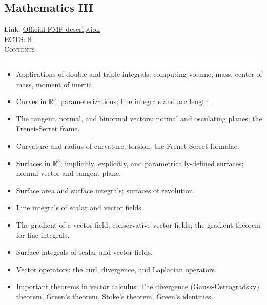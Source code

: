\documentclass[11pt, a4paper]{article}
\newenvironment{course}[3]{
\subsection{#1}%
Link: \href{#2}{Official FMF description}\\%
ECTS: #3%
\vspace{1ex}
\\
{\large \textsc{Contents}}\\[-0.9ex]%
\rule{\textwidth}{0.5pt}
\vspace{-3ex}
}
{}
\newenvironment{chapter}[1]{
\begin{tcolorbox}[title=#1, breakable]
}
{\end{tcolorbox}}
\begin{document}
\begin{course}{Mathematics III}{https://www.fmf.uni-lj.si/en/study-physics/programmes/1fiz/2020/7000777/courses/522/}{8}
\begin{chapter}{Multi-dimensional Riemann integration}
\begin{itemize}
            \item Applications of double and triple integrals: computing volume, mass, center of mass, moment of inertia.
        
        \end{itemize}
    \end{chapter}

    \begin{chapter}{Curves and surfaces in Euclidean space}
        \begin{itemize}
        
            \item Curves in $ \mathbb{R}^{3} $; parameterizations; line integrals and arc length.

            \item The tangent, normal, and binormal vectors; normal and osculating planes; the Frenet-Serret frame.

            \item Curvature and radius of curvature; torsion; the Frenet-Serret formulae.

            \item Surfaces in $ \mathbb{R}^{3} $; implicitly, explicitly, and parametrically-defined surfaces; normal vector and tangent plane.

            \item Surface area and surface integrals; surfaces of revolution.
        
        \end{itemize}

    \end{chapter}

    \begin{chapter}{Vector calculus}
        \begin{itemize}
        
            \item Line integrals of scalar and vector fields.

            \item The gradient of a vector field; conservative vector fields; the gradient theorem for line integrals.

            \item Surface integrals of scalar and vector fields.

            \item Vector operators: the curl, divergence, and Laplacian operators.

            \item Important theorems in vector calculus: The divergence (Gauss-Ostrogradsky) theorem, Green's theorem, Stoke's theorem, Green's identities.


\end{itemize}
\end{chapter}
\end{course}
\end{document}
